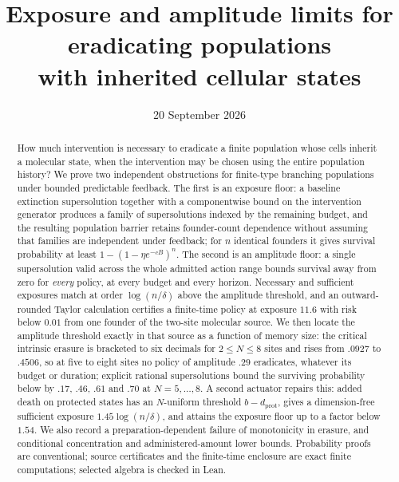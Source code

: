 \documentclass[11pt]{article}
\title{Exposure and amplitude limits for eradicating populations\\
with inherited cellular states}
\author{}
\date{20 September 2026}
\theoremstyle{remark}\newtheorem{remark}[theorem]{Remark}
\begin{document}
\maketitle

\begin{abstract}
How much intervention is necessary to eradicate a finite population whose cells
inherit a molecular state, when the intervention may be chosen using the entire
population history? We prove two independent obstructions for finite-type
branching populations under bounded predictable feedback. The first is an
exposure floor: a baseline extinction supersolution together with a
componentwise bound on the intervention generator produces a family of
supersolutions indexed by the remaining budget, and the resulting population
barrier retains founder-count dependence without assuming that families are
independent under feedback; for $n$ identical founders it gives survival
probability at least $1-(1-\eta e^{-cB})^n$. The second is an amplitude floor:
a single supersolution valid across the whole admitted action range bounds
survival away from zero for \emph{every} policy, at every budget and every
horizon. Necessary and sufficient exposures match at order $\log(n/\delta)$
above the amplitude threshold, and an outward-rounded Taylor calculation
certifies a finite-time policy at exposure $11.6$ with risk below $0.01$ from
one founder of the two-site molecular source. We then locate the amplitude
threshold exactly in that source as a function of memory size: the critical
intrinsic erasure is bracketed to six decimals for $2\le N\le 8$ sites and rises
from $.0927$ to $.4506$, so at five to eight sites no policy of amplitude $.29$
eradicates, whatever its budget or duration; explicit rational supersolutions
bound the surviving probability below by $.17$, $.46$, $.61$ and $.70$ at
$N=5,\dots,8$. A second actuator repairs this: added death on protected states
has an $N$-uniform threshold $b-d_{\mathrm{prot}}$, gives a dimension-free
sufficient exposure $1.45\log(n/\delta)$, and attains the exposure floor up to a
factor below $1.54$. We also record a preparation-dependent failure of
monotonicity in erasure, and conditional concentration and administered-amount
lower bounds. Probability proofs are conventional; source certificates and the
finite-time enclosure are exact finite computations; selected algebra is
checked in Lean.
\end{abstract}

\tableofcontents











\appendix





\begingroup
\small
\setlength{\bibsep}{3pt}


\endgroup
\end{document}
